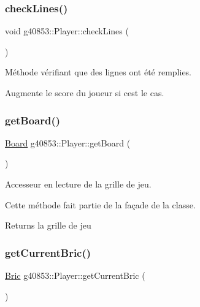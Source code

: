 \subsubsection{\texorpdfstring{check\+Lines()}{checkLines()}}
{\footnotesize\ttfamily void g40853\+::\+Player\+::check\+Lines (\begin{DoxyParamCaption}{ }\end{DoxyParamCaption})}



Méthode vérifiant que des lignes ont été remplies. 

Augmente le score du joueur si c\textquotesingle{}est le cas. \hypertarget{classg40853_1_1_player_a76d25f8b4776c282e9852b7ae9fad017}{}\label{classg40853_1_1_player_a76d25f8b4776c282e9852b7ae9fad017} 
\subsubsection{\texorpdfstring{get\+Board()}{getBoard()}}
{\footnotesize\ttfamily \hyperlink{classg40853_1_1_board}{Board} g40853\+::\+Player\+::get\+Board (\begin{DoxyParamCaption}{ }\end{DoxyParamCaption})\hspace{0.3cm}{\ttfamily [inline]}}



Accesseur en lecture de la grille de jeu. 

Cette méthode fait partie de la façade de la classe.

\begin{DoxyReturn}{Returns}
la grille de jeu 
\end{DoxyReturn}
\hypertarget{classg40853_1_1_player_abda6e0fda90db2b7bb252907529f8bb5}{}\label{classg40853_1_1_player_abda6e0fda90db2b7bb252907529f8bb5} 
\subsubsection{\texorpdfstring{get\+Current\+Bric()}{getCurrentBric()}}
{\footnotesize\ttfamily \hyperlink{classg40853_1_1_bric}{Bric} g40853\+::\+Player\+::get\+Current\+Bric (\begin{DoxyParamCaption}{ }\end{DoxyParamCaption})\hspace{0.3cm}{\ttfamily [inline]}}



